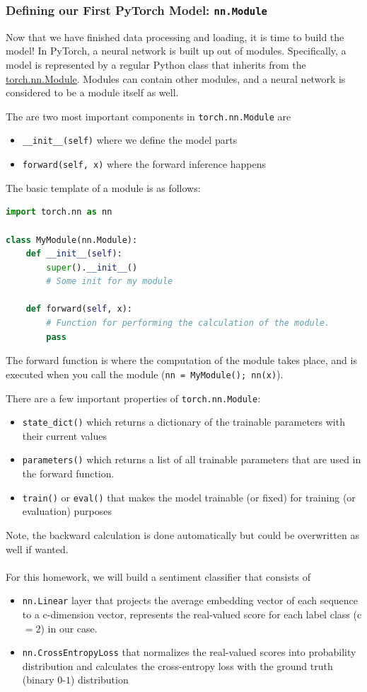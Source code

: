 \subsubsection{Defining our First PyTorch Model: \texttt{nn.Module}}
\noindent Now that we have finished data processing and loading, it is time to build the model! In PyTorch, a neural network is built up out of modules. 
Specifically, a model is represented by a regular Python class that inherits from the \href{https://pytorch.org/docs/stable/generated/torch.nn.Module.html}{torch.nn.Module}.
Modules can contain other modules, and a neural network is considered to be a module itself as well. 

\noindent The are two most important components in \texttt{torch.nn.Module} are
\begin{itemize}
    \item \texttt{\_\_init\_\_(self)} where we define the model parts
    \item \texttt{forward(self, x)} where the forward inference happens
\end{itemize}
The basic template of a module is as follows:
\begin{lstlisting}[language=Python]
import torch.nn as nn

class MyModule(nn.Module):
    def __init__(self):
        super().__init__()
        # Some init for my module
        
    def forward(self, x):
        # Function for performing the calculation of the module.
        pass
\end{lstlisting}

The forward function is where the computation of the module takes place, and is executed when you call the module (\texttt{nn = MyModule(); nn(x)}).

There are a few important properties of \texttt{torch.nn.Module}:
\begin{itemize}
    \item \texttt{state\_dict()} which returns a dictionary of the trainable parameters with their current values
    \item \texttt{parameters()} which returns a list of all trainable parameters that are used in the forward function.
    \item \texttt{train()} or \texttt{eval()} that makes the model trainable (or fixed) for training (or evaluation) purposes
\end{itemize} 
Note, the backward calculation is done automatically but could be overwritten as well if wanted.
\\\\
For this homework, we will build a sentiment classifier that consists of
\begin{itemize}
    \item \texttt{nn.Linear} layer that projects the average embedding vector of each sequence to a c-dimension vector, represents the real-valued score for each label class (c $ =2$) in our case.
    \item \texttt{nn.CrossEntropyLoss} that normalizes the real-valued scores into probability distribution and calculates the cross-entropy loss with the ground truth (binary $0$-$1$) distribution 
\end{itemize}

